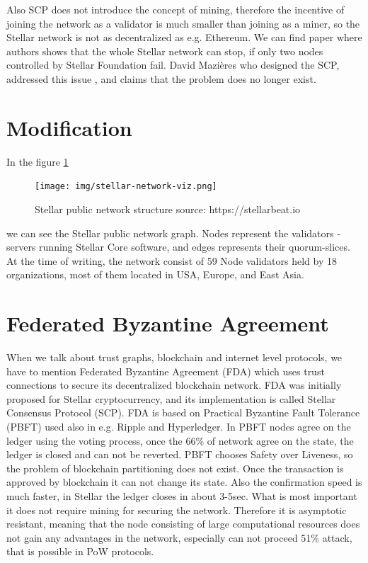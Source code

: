 \documentclass[nostrict]{szablonPG}
\begin{document}
Also SCP does not introduce the concept of mining, therefore the incentive of joining the network as a validator is much smaller than joining as a miner, so the Stellar network is not as decentralized as e.g. Ethereum. We can find paper \cite{kim2019stellar} where authors shows that the whole Stellar network can stop, if only two nodes controlled by Stellar Foundation fail. David Mazières who designed the SCP, addressed this issue \cite{Safetyvs90:online}, and claims that the problem does no longer exist.

\section{Modification}


In the figure \ref{fig:network-viz} 
\begin{figure}[h!]
\texttt{[image: img/stellar-network-viz.png]}
\centering
\caption{Stellar public network structure source: https://stellarbeat.io}
\label{fig:network-viz}
\end{figure} 
we can see the Stellar public network graph. Nodes represent the validators - servers running Stellar Core software, and edges represents their quorum-slices. At the time of writing, the network consist of 59 Node validators held by 18 organizations, most of them located in USA, Europe, and East Asia.



\section{Federated Byzantine Agreement}
When we talk about trust graphs, blockchain and internet level protocols, we have to mention Federated Byzantine Agreement (FDA) which uses trust connections to secure its decentralized blockchain network. FDA was initially proposed for Stellar cryptocurrency, and its implementation is called Stellar Consensus Protocol (SCP). FDA is based on Practical Byzantine Fault Tolerance (PBFT) \cite{castro1999practical} used also in e.g. Ripple and Hyperledger. In PBFT nodes agree on the ledger using the voting process, once the 66\% of network agree on the state, the ledger is closed and can not be reverted. PBFT chooses Safety over Liveness, so the problem of blockchain partitioning does not exist. Once the transaction is approved by blockchain it can not change its state. Also the confirmation speed is much faster, in Stellar the ledger closes in about 3-5sec. What is most important it does not require mining for securing the network. Therefore it is asymptotic resistant, meaning that the node consisting of large computational resources does not gain any advantages in the network, especially can not proceed 51\% attack, that is possible in PoW protocols. 
\end{document}
